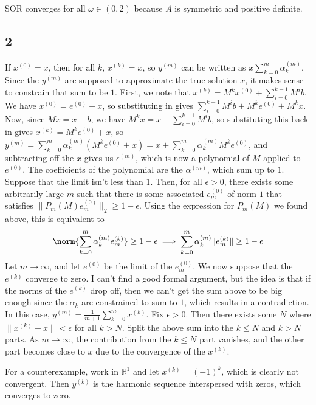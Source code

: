 \documentclass{article}
\newcommand{\ep}{\epsilon}
\newcommand{\rn}{\mathbb{R}}
\begin{document}
SOR converges for all $\omega\in(0,2)$ because $A$ is symmetric and positive definite.
\subsection*{2}
If $x^{(0)}=x$, then for all $k$, $x^{(k)}=x$, so $y^{(m)}$ can be written as $x\sum_{k=0}^m\alpha_k^{(m)}$. Since the $y^{(m)}$ are supposed to approximate the true solution $x$, it makes sense to constrain that sum to be $1$.
First, we note that $x^{(k)}=M^kx^{(0)}+\sum_{i=0}^{k-1}M^{i}b$. We have $x^{(0)}=e^{(0)}+x$, so substituting in gives $\sum_{i=0}^{k-1}M^{i}b+M^ke^{(0)}+M^kx$. Now, since $Mx=x-b$, we have $M^kx=x-\sum_{i=0}^{k-1}M^ib$, so substituting this back in gives $x^{(k)}=M^ke^{(0)}+x$, so $y^{(m)}=\sum_{k=0}^m\alpha_k^{(m)}(M^ke^{(0)}+x)=x+\sum_{k=0}^m\alpha_k^{(m)}M^ke^{(0)}$, and subtracting off the $x$ gives us $\ep^{(m)}$, which is now a polynomial of $M$ applied to $e^{(0)}$. The coefficients of the polynomial are the $\alpha^{(m)}$, which sum up to $1$.
Suppose that the limit isn't less than $1$. Then, for all $\ep>0$, there exists some arbitrarily large $m$ such that there is some associated $e_m^{(0)}$ of norm $1$ that satisfies $\|P_m(M)e_m^{(0)}\|_2\geq1-\ep$. Using the expression for $P_m(M)$ we found above, this is equivalent to 
\[\norm{\sum_{k=0}^m\alpha_k^{(m)}e_m^{(k)}}\geq1-\ep\implies\sum_{k=0}^m\alpha_k^{(m)}\|e_m^{(k)}\|\geq1-\ep\]
Let $m\to\infty$, and let $e^(0)$ be the limit of the $e_m^{(0)}$. We now suppose that the $e^{(k)}$ converge to zero. I can't find a good formal argument, but the idea is that if the norms of the $e^{(k)}$ drop off, then we can't get the sum above to be big enough since the $\alpha_k$ are constrained to sum to $1$, which results in a contradiction. %
In this case, $y^{(m)}=\frac{1}{m+1}\sum_{k=0}^mx^{(k)}$. Fix $\ep>0$. Then there exists some $N$ where $\|x^{(k)}-x\|<\ep$ for all $k>N$. Split the above sum into the $k\leq N$ and $k>N$ parts. As $m\to\infty$, the contribution from the $k\leq N$ part vanishes, and the other part becomes close to $x$ due to the convergence of the $x^{(k)}$.

For a counterexample, work in $\rn^1$ and let $x^{(k)}=(-1)^k$, which is clearly not convergent. Then $y^{(k)}$ is the harmonic sequence interspersed with zeros, which converges to zero. 
\end{document}
